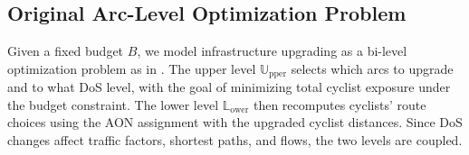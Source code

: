 \documentclass[lettersize,journal]{IEEEtran}
\begin{document}
\subsection{Original Arc-Level Optimization Problem}
\label{subsec:original_optimization}




Given a fixed budget $B$, we model infrastructure upgrading as a bi-level
optimization problem as in \cite{jurado2025improving}. The upper level $\mathbb{U}_{\mathrm{pper}}$ selects which arcs to upgrade and to what
DoS level, with the goal of minimizing total cyclist exposure under the budget
constraint. The lower level $\mathbb{L}_{\mathrm{ower}}$ then recomputes cyclists' route choices using the
AON assignment with the upgraded cyclist distances. Since DoS changes affect
traffic factors, shortest paths, and flows, the two levels are coupled.
\end{document}
